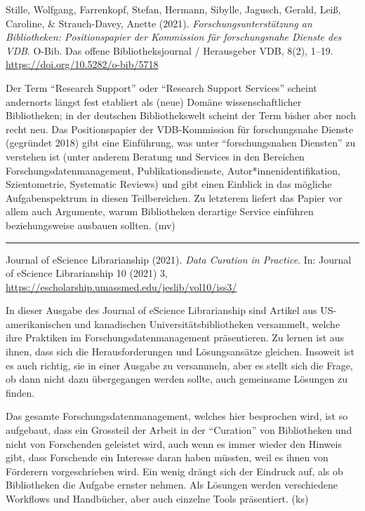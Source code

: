 \documentclass[a4paper,
fontsize=11pt,
oneside,
numbers=noperiodatend,
parskip=half-,
bibliography=totoc,
final
]{scrartcl}
\begin{document}
Stille, Wolfgang, Farrenkopf, Stefan, Hermann, Sibylle, Jagusch, Gerald,
Leiß, Caroline, \& Strauch-Davey, Anette (2021).
\emph{Forschungsunterstützung an Bibliotheken: Positionspapier der
Kommission für forschungsnahe Dienste des VDB}. O-Bib. Das offene
Bibliotheksjournal / Herausgeber VDB, 8(2), 1--19.
\url{https://doi.org/10.5282/o-bib/5718}

Der Term \enquote{Research Support} oder \enquote{Research Support
Services} scheint andernorts längst fest etabliert als (neue) Domäne
wissenschaftlicher Bibliotheken; in der deutschen Bibliothekswelt
scheint der Term bisher aber noch recht neu. Das Positionspapier der
VDB-Kommission für forschungsnahe Dienste (gegründet 2018) gibt eine
Einführung, was unter \enquote{forschungsnahen Diensten} zu verstehen
ist (unter anderem Beratung und Services in den Bereichen
Forschungsdatenmanagement, Publikationsdienste,
Autor*innenidentifikation, Szientometrie, Systematic Reviews) und gibt
einen Einblick in das mögliche Aufgabenspektrum in diesen Teilbereichen.
Zu letzterem liefert das Papier vor allem auch Argumente, warum
Bibliotheken derartige Service einführen beziehungsweise ausbauen
sollten. (mv)

\begin{center}\rule{0.5\linewidth}{0.5pt}\end{center}

Journal of eScience Librarianship (2021). \emph{Data Curation in
Practice}. In: Journal of eScience Librarianship 10 (2021) 3,
\url{https://escholarship.umassmed.edu/jeslib/vol10/iss3/}

In dieser Ausgabe des Journal of eScience Librarianship sind Artikel aus
US-amerikanischen und kanadischen Universitätsbibliotheken versammelt,
welche ihre Praktiken im Forschungsdatenmanagement präsentieren. Zu
lernen ist aus ihnen, dass sich die Herausforderungen und Lösungsansätze
gleichen. Insoweit ist es auch richtig, sie in einer Ausgabe zu
versammeln, aber es stellt sich die Frage, ob dann nicht dazu
übergegangen werden sollte, auch gemeinsame Lösungen zu finden.

Das gesamte Forschungsdatenmanagement, welches hier besprochen wird, ist
so aufgebaut, dass ein Grossteil der Arbeit in der \enquote{Curation}
von Bibliotheken und nicht von Forschenden geleistet wird, auch wenn es
immer wieder den Hinweis gibt, dass Forschende ein Interesse daran haben
müssten, weil es ihnen von Förderern vorgeschrieben wird. Ein wenig
drängt sich der Eindruck auf, als ob Bibliotheken die Aufgabe ernster
nehmen. Als Lösungen werden verschiedene Workflows und Handbücher, aber
auch einzelne Tools präsentiert. (ks)
\end{document}
